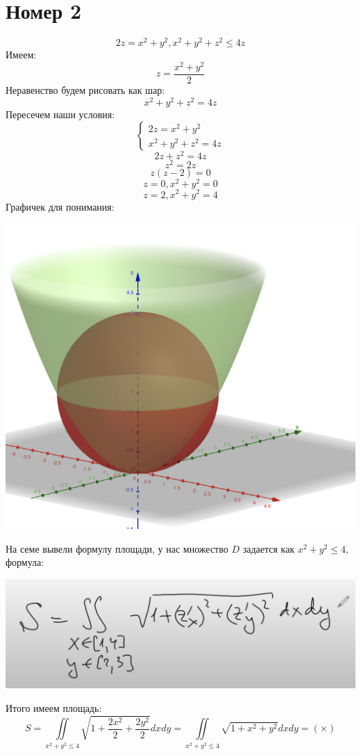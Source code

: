 \documentclass[a4paper,12pt]{article}
\begin{document}
\section*{Номер 2}
\[
2z =  x^2 + y^2, x^2 + y^2 + z^2 \leq 4z
\]
Имеем:
\[
z = \frac{x^2+y^2}{2}
\]
Неравенство будем рисовать как шар:
\[
x^2 + y^2 + z^2 = 4z
\]
Пересечем наши условия:
\[
\begin{cases}
2z = x^2 + y^2 \\
x^2 + y^2 + z^2 = 4z
\end{cases}
\]
\[
2z + z^2 = 4z
\]
\[
z^2 = 2z
\]
\[
z(z - 2) = 0
\]
\[
z = 0 , x^2 + y^2 = 0
\]
\[
z = 2, x^2 + y^2 =4 
\]
Графичек для понимания:
\begin{center}
\includegraphics[scale=0.3]{2.png}
\end{center}
На семе вывели формулу площади, у нас множество $D$ задается как $x^2 + y^2 \leq 4$, формула:
\begin{center}
\includegraphics[scale=0.4]{3.png}
\end{center}
Итого имеем площадь:
\[
S = \iint\limits_{x^2 + y^2 \leq 4} \sqrt{1 + \frac{2x^2}{2} + \frac{2y^2}{2}} dx dy =  \iint\limits_{x^2 + y^2 \leq 4} \sqrt{1 + x^2 + y^2} dx dy = (\times)
 \]
\end{document}
